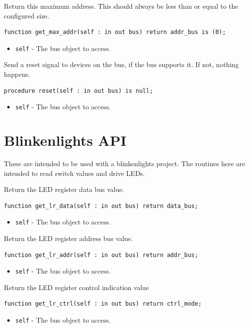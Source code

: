 \documentclass[10pt, openany]{book}
\newcommand{\keyword}[1]{\texttt{#1}}
\begin{document}
Return this maximum address.
This should always be less than or equal to the configured size.
\begin{lstlisting}
function get_max_addr(self : in out bus) return addr_bus is (0);
\end{lstlisting}
\begin{itemize}
  \item \keyword{self} - The bus object to access.
\end{itemize}

Send a reset signal to devices on the bus, if the bus supports it.
If not, nothing happens.
\begin{lstlisting}
procedure reset(self : in out bus) is null;
\end{lstlisting}
\begin{itemize}
  \item \keyword{self} - The bus object to access.
\end{itemize}

\section{Blinkenlights API}
These are intended to be used with a blinkenlights project.
The routines here are intended to read switch values and drive LEDs.

Return the LED register data bus value.
\begin{lstlisting}
function get_lr_data(self : in out bus) return data_bus;
\end{lstlisting}
\begin{itemize}
  \item \keyword{self} - The bus object to access.
\end{itemize}

Return the LED register address bus value.
\begin{lstlisting}
function get_lr_addr(self : in out bus) return addr_bus;
\end{lstlisting}
\begin{itemize}
  \item \keyword{self} - The bus object to access.
\end{itemize}

Return the LED register control indication value
\begin{lstlisting}
function get_lr_ctrl(self : in out bus) return ctrl_mode;
\end{lstlisting}
\begin{itemize}
  \item \keyword{self} - The bus object to access.
\end{itemize}
\end{document}
